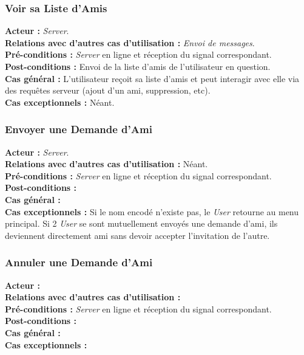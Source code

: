 \documentclass[10pt, a4paper]{article}
\begin{document}
\subsubsection{Voir sa Liste d'Amis}
\textbf{Acteur :} \textit{Server}. \\
\textbf{Relations avec d'autres cas d'utilisation :} {\itshape Envoi de messages}. \\
\textbf{Pré-conditions :} \textit{Server} en ligne et réception du signal correspondant. \\
\textbf{Post-conditions :} Envoi de la liste d'amis de l'utilisateur en question. \\
\textbf{Cas général :} L'utilisateur reçoit sa liste d'amis et peut interagir avec elle via des requêtes serveur (ajout d'un ami, suppression, etc).\\
\textbf{Cas exceptionnels :} Néant. \\

\subsubsection{Envoyer une Demande d'Ami}
\textbf{Acteur :} \textit{Server}.\\
\textbf{Relations avec d'autres cas d'utilisation :} Néant. \\
\textbf{Pré-conditions :} \textit{Server} en ligne et réception du signal correspondant. \\
\textbf{Post-conditions :} \\
\textbf{Cas général :} \\
\textbf{Cas exceptionnels :} Si le nom encodé n'existe pas, le \textit{User} retourne au menu principal. Si 2 \textit{User} se sont mutuellement envoyés une demande d'ami, ils deviennent directement ami sans devoir accepter l'invitation de l'autre.

\subsubsection{Annuler une Demande d'Ami}
\textbf{Acteur :} \\
\textbf{Relations avec d'autres cas d'utilisation :} \\
\textbf{Pré-conditions :} \textit{Server} en ligne et réception du signal correspondant. \\
\textbf{Post-conditions :} \\
\textbf{Cas général :} \\
\textbf{Cas exceptionnels :}
\end{document}
